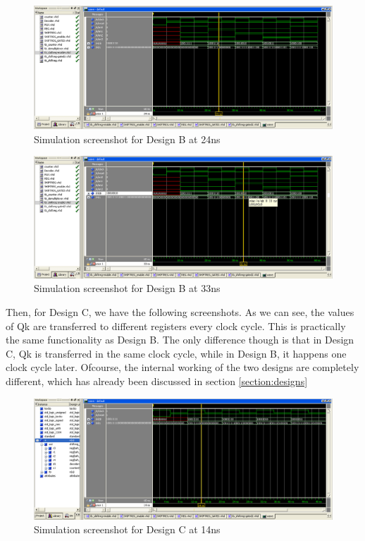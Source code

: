 \documentclass[11pt,a4paper]{article}
\begin{document}
\begin{figure}[htp]
\centering
\includegraphics[length = 4in,width = 6.5in]{./images/simsre2.png}
\caption{Simulation screenshot for Design B at 24ns}
\end{figure}

\begin{figure}[htp]
\centering
\includegraphics[length = 4in,width = 6.5in]{./images/simsre3.png}
\caption{Simulation screenshot for Design B at 33ns}
\end{figure}

\newpage
Then, for Design C, we have the following screenshots. As we can see, the values of Qk are transferred to different registers every clock cycle. This is practically the same functionality as Design B. The only difference though is that in Design C, Qk is transferred in the same clock cycle, while in Design B, it happens one clock cycle later. Ofcourse, the internal working of the two designs are completely different, which has already been discussed in section \ref{section:designs}

\begin{figure}[htp]
\centering
\includegraphics[length = 4in,width = 6.5in]{./images/simsrg1.png}
\caption{Simulation screenshot for Design C at 14ns}
\end{figure}
\end{document}
